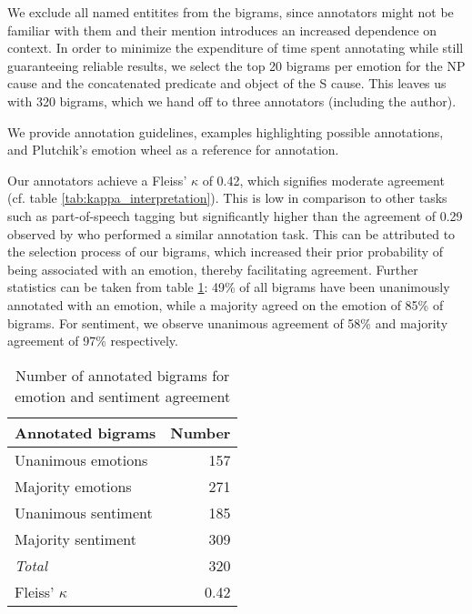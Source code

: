 We exclude all named entitites from the bigrams, since annotators might not be familiar with them and their mention introduces an increased dependence on context.
In order to minimize the expenditure of time spent annotating while still guaranteeing reliable results, we select the top 20 bigrams per emotion for the NP cause and the concatenated predicate and object of the S cause. This leaves us with 320 bigrams, which we hand off to three annotators (including the author). 

We provide annotation guidelines, examples highlighting possible annotations, and Plutchik's emotion wheel as a reference for annotation.

Our annotators achieve a Fleiss' $\kappa$ of 0.42, which signifies moderate agreement \cite{kappa} (cf. table \ref{tab:kappa_interpretation}). This is low in comparison to other tasks such as part-of-speech tagging but significantly higher than the agreement of 0.29 observed by \citeauthor{nrc} who performed a similar annotation task. This can be attributed to the selection process of our bigrams, which increased their prior probability of being associated with an emotion, thereby facilitating agreement. Further statistics can be taken from table \ref{tab:annotation-bigrams}: 49\% of all bigrams have been unanimously annotated with an emotion, while a majority agreed on the emotion of 85\% of bigrams. For sentiment, we observe unanimous agreement of 58\% and majority agreement of 97\% respectively.

\begin{table}
\centering
\begin{tabular}{l|r}
\textbf{Annotated bigrams} & \textbf{Number}\\\hline
Unanimous emotions & 157\\
Majority emotions & 271\\
Unanimous sentiment & 185\\
Majority sentiment & 309\\\hline
\textit{Total} & 320\\\hline
Fleiss' $\kappa$ & 0.42
\end{tabular}
\caption{Number of annotated bigrams for emotion and sentiment agreement}
\label{tab:annotation-bigrams}
\end{table}

